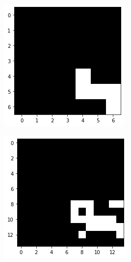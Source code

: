 \documentclass[10pt,twocolumn,hidelinks,letterpaper]{article}
\begin{document}
\begin{figure}
\begin{subfigure}{.59\linewidth}
\begin{subfigure}{.325\linewidth}
  		\includegraphics[width=\linewidth]{images/mmaps_example/downsampling7x7_bw.png}
  	\end{subfigure}
  	\begin{subfigure}{.325\linewidth}
  		\includegraphics[width=\linewidth]{images/mmaps_example/downsampling14x14_bw.png}

\end{subfigure}
\end{subfigure}
\end{figure}
\end{document}
